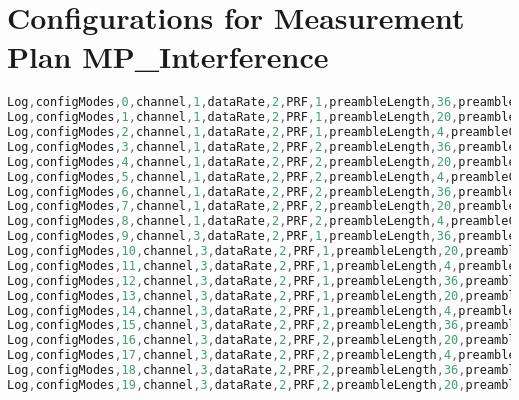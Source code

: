\chapter{Configurations for Measurement Plan MP\_Interference}
\begin{lstlisting}[caption={Configurations for Measurement Plan MP\_Interference}, label={app:ConfigurationsforMeasurementPlanMPInterference}, language=C]
Log,configModes,0,channel,1,dataRate,2,PRF,1,preambleLength,36,preambleCodes,1,smartPower,0,nonStandardSFD,0
Log,configModes,1,channel,1,dataRate,2,PRF,1,preambleLength,20,preambleCodes,2,smartPower,0,nonStandardSFD,0
Log,configModes,2,channel,1,dataRate,2,PRF,1,preambleLength,4,preambleCodes,1,smartPower,0,nonStandardSFD,0
Log,configModes,3,channel,1,dataRate,2,PRF,2,preambleLength,36,preambleCodes,9,smartPower,0,nonStandardSFD,1
Log,configModes,4,channel,1,dataRate,2,PRF,2,preambleLength,20,preambleCodes,10,smartPower,0,nonStandardSFD,1
Log,configModes,5,channel,1,dataRate,2,PRF,2,preambleLength,4,preambleCodes,11,smartPower,0,nonStandardSFD,1
Log,configModes,6,channel,1,dataRate,2,PRF,2,preambleLength,36,preambleCodes,12,smartPower,1,nonStandardSFD,1
Log,configModes,7,channel,1,dataRate,2,PRF,2,preambleLength,20,preambleCodes,9,smartPower,1,nonStandardSFD,0
Log,configModes,8,channel,1,dataRate,2,PRF,2,preambleLength,4,preambleCodes,10,smartPower,1,nonStandardSFD,0
Log,configModes,9,channel,3,dataRate,2,PRF,1,preambleLength,36,preambleCodes,5,smartPower,0,nonStandardSFD,1
Log,configModes,10,channel,3,dataRate,2,PRF,1,preambleLength,20,preambleCodes,6,smartPower,0,nonStandardSFD,1
Log,configModes,11,channel,3,dataRate,2,PRF,1,preambleLength,4,preambleCodes,5,smartPower,0,nonStandardSFD,1
Log,configModes,12,channel,3,dataRate,2,PRF,1,preambleLength,36,preambleCodes,6,smartPower,0,nonStandardSFD,0
Log,configModes,13,channel,3,dataRate,2,PRF,1,preambleLength,20,preambleCodes,5,smartPower,0,nonStandardSFD,0
Log,configModes,14,channel,3,dataRate,2,PRF,1,preambleLength,4,preambleCodes,6,smartPower,0,nonStandardSFD,0
Log,configModes,15,channel,3,dataRate,2,PRF,2,preambleLength,36,preambleCodes,9,smartPower,0,nonStandardSFD,1
Log,configModes,16,channel,3,dataRate,2,PRF,2,preambleLength,20,preambleCodes,10,smartPower,0,nonStandardSFD,1
Log,configModes,17,channel,3,dataRate,2,PRF,2,preambleLength,4,preambleCodes,11,smartPower,0,nonStandardSFD,1
Log,configModes,18,channel,3,dataRate,2,PRF,2,preambleLength,36,preambleCodes,12,smartPower,1,nonStandardSFD,1
Log,configModes,19,channel,3,dataRate,2,PRF,2,preambleLength,20,preambleCodes,9,smartPower,1,nonStandardSFD,0

\end{lstlisting}
